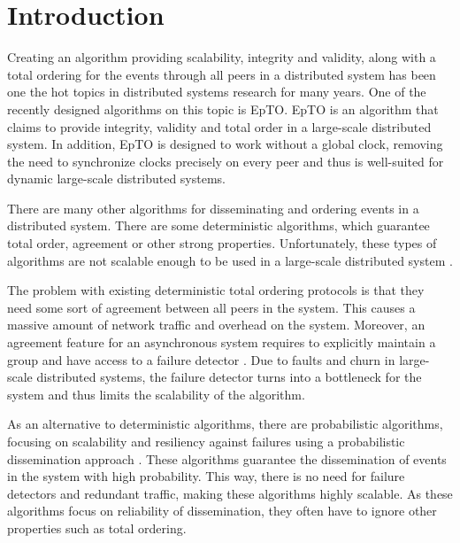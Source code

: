 \documentclass[10pt,conference,a4paper]{IEEEtran}
\begin{document}
\section{Introduction}
Creating an algorithm providing scalability, integrity and validity, along with a total ordering for the events through all peers in a distributed system has been one the hot topics in distributed systems research for many years. One of the recently designed algorithms on this topic is EpTO. EpTO is an algorithm that claims to provide integrity, validity and total order in a large-scale distributed system. In addition, EpTO is designed to work without a global clock, removing the need to synchronize clocks precisely on every peer and thus is well-suited for dynamic large-scale distributed systems.
\par 
There are many other algorithms for disseminating and ordering events in a distributed system. There are some deterministic algorithms, which guarantee total order, agreement or other strong properties. Unfortunately, these types of algorithms are not scalable enough to be used in a large-scale distributed system \autocites[]{defago2004total}[]{lamport1978time}.
\par
The problem with existing deterministic total ordering protocols is that they need some sort of agreement between all peers in the system. This causes a massive amount of network traffic and overhead on the system.
Moreover, an agreement feature for an asynchronous system requires to
explicitly maintain a group and have access to a failure detector \autocites[]{chandra1996weakest}[]{chandra1996unreliable}. Due to faults and churn in large-scale distributed systems, the failure detector turns into a bottleneck for the system and thus limits the scalability of the algorithm.
\par
As an alternative to deterministic algorithms, there are probabilistic algorithms, focusing on scalability and resiliency against failures using a probabilistic dissemination approach \autocites []{birman1999bimodal}[]{carvalho2007emergent}[]{demers1987epidemic}[]{eugster2003lightweight}[]{felber2002probabilistic}[]{hayden1996probabilistic}[]{kim2004gossip}[]{Koldehofe02simplegossiping}. These algorithms guarantee the dissemination of events in the system with high probability. This way, there is no need for failure detectors and redundant traffic, making these algorithms highly scalable. As these algorithms focus on reliability of dissemination, they often have to ignore other properties such as total ordering.
\par
\end{document}
